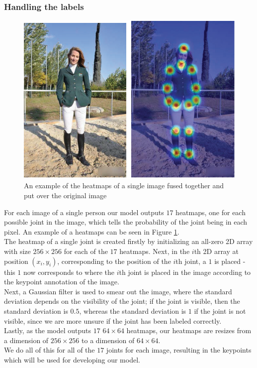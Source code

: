 \documentclass[main.tex]{subfiles}
\begin{document}
\subsubsection{Handling the labels}
\begin{figure}[H]
    \centering
    \includegraphics[height = 4 cm]{../entities/heatmaps_ex.PNG}
    \caption{An example of the heatmaps of a single image fused together and put over the original image \cite{survey_1}}
    \label{fig:heatmaps_ex}
\end{figure}
For each image of a single person our model outputs $17$ heatmaps, one for each possible joint in the image, which tells the probability of the joint being in each pixel. An example of a heatmaps can be seen in Figure \ref{fig:heatmaps_ex}. \\
The heatmap of a single joint is created firstly by initializing an all-zero 2D array with size $256 \times 256$ for each of the $17$ heatmaps. Next, in the $i$th 2D array at position $(x_i, y_i)$, corresponding to the position of the $i$th joint, a $1$ is placed - this $1$ now corresponds to where the $i$th joint is placed in the image according to the keypoint annotation of the image. \\
Next, a Gaussian filter is used to smear out the image, where the standard deviation depends on the visibility of the joint; if the joint is visible, then the standard deviation is $0.5$, whereas the standard deviation is $1$ if the joint is not visible, since we are more unsure if the joint has been labeled correctly.\\
Lastly, as the model outputs $17$ $64 \times 64$ heatmaps, our heatmaps are resizes from a dimension of $256 \times 256$ to a dimension of $64 \times 64$. \\
We do all of this for all of the $17$ joints for each image, resulting in the keypoints which will be used for developing our model.
\end{document}

